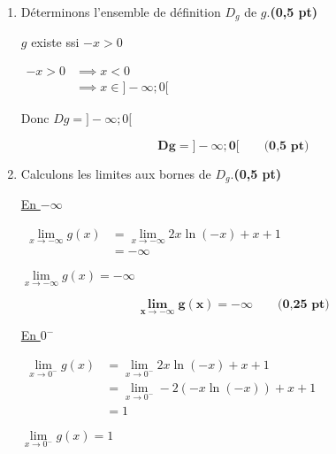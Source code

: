 \documentclass[12pt,a4paper]{article}
\begin{document}
\begin{enumerate}
    \item Déterminons l’ensemble de définition \( D_g \) de \( g \).\hfill \textbf{(0,5 pt)}

          \(g\) existe ssi \(-x>0\)

          \(\begin{aligned}
              -x>0 & \implies x<0              \\
                   & \implies x\in ]-\infty;0[
          \end{aligned}\)

          Donc \(Dg=]-\infty;0[\)

          \begin{resultbox}
              \[
                  \mathbf{Dg=]-\infty;0[}\quad\quad\textbf{(0,5 pt)}
              \] 
          \end{resultbox}

    \item Calculons les limites aux bornes de \( D_g \).\hfill \textbf{(0,5 pt)}

          \underline{En $-\infty$}

          \( \begin{aligned}
              \lim\limits_{x\to -\infty}g(x) & =\lim\limits_{x\to -\infty} 2x \ln(-x) + x + 1 \\
                                             & =-\infty
          \end{aligned} \)

          \( \lim\limits_{x\to -\infty}g(x) = -\infty \)

          \begin{resultbox}
              \[
                  \mathbf{\lim\limits_{x\to -\infty}g(x) = -\infty}\quad\quad\textbf{(0,25 pt)}
              \]
          \end{resultbox}

          \underline{En $0^{-}$}

          \( \begin{aligned}
              \lim\limits_{x\to 0^{-}}g(x) & =\lim\limits_{x\to 0^{-}} 2x \ln(-x) + x + 1     \\
                                           & =\lim\limits_{x\to 0^{-}} -2(-x \ln(-x)) + x + 1 \\
                                           & =1
          \end{aligned} \)

          \( \lim\limits_{x\to 0^{-}}g(x) = 1 \)


\end{enumerate}
\end{document}
